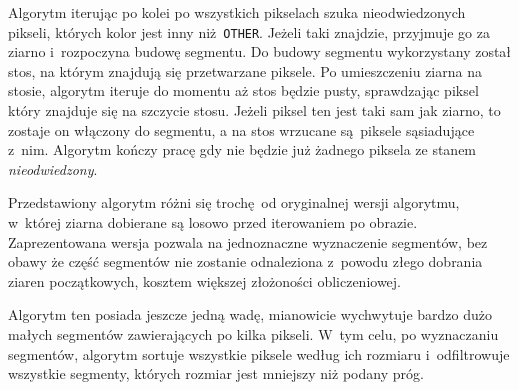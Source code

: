 Algorytm iterując po kolei po wszystkich pikselach szuka nieodwiedzonych pikseli, których kolor jest inny niż \texttt{OTHER}. Jeżeli taki znajdzie, przyjmuje go za ziarno i~rozpoczyna budowę segmentu. Do budowy segmentu wykorzystany został stos, na którym znajdują się przetwarzane piksele. Po umieszczeniu ziarna na stosie, algorytm iteruje do momentu aż stos będzie pusty, sprawdzając piksel który znajduje się na szczycie stosu. Jeżeli piksel ten jest taki sam jak ziarno, to zostaje on włączony do segmentu, a na stos wrzucane są piksele sąsiadujące z~nim. Algorytm kończy pracę gdy nie będzie już żadnego piksela ze stanem \emph{nieodwiedzony}.

Przedstawiony algorytm różni się trochę od oryginalnej wersji algorytmu, w~której ziarna dobierane są losowo przed iterowaniem po obrazie. Zaprezentowana wersja pozwala na jednoznaczne wyznaczenie segmentów, bez obawy że część segmentów nie zostanie odnaleziona z~powodu złego dobrania ziaren początkowych, kosztem większej złożoności obliczeniowej.

Algorytm ten posiada jeszcze jedną wadę, mianowicie wychwytuje bardzo dużo małych segmentów zawierających po kilka pikseli. W~tym celu, po wyznaczaniu segmentów, algorytm sortuje wszystkie piksele według ich rozmiaru i~odfiltrowuje wszystkie segmenty, których rozmiar jest mniejszy niż podany próg.
